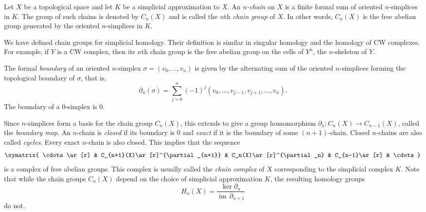 \documentclass[12pt]{article}
\newcommand{\<}{\langle}
\renewcommand{\>}{\rangle}
\DeclareMathOperator{\im}{im}
\begin{document}
Let $X$ be a topological space and let $K$ be a simplicial approximation to $X$.  An \emph{$n$-chain} on $X$ is a finite formal sum of oriented $n$-simplices in $K$.  The group of such chains is denoted by $C_n(X)$ and is called the $n$th \emph{chain group} of $X$.  In other words, $C_n(X)$ is the free abelian group generated by the oriented $n$-simplices in $K$.

We have defined chain groups for simplicial homology.  Their definition is similar in singular homology and the homology of CW complexes.  For example, if $Y$ is a CW complex, then its $n$th chain group is the free abelian group on the cells of $Y^n$, the $n$-skeleton of $Y$.

The formal \emph{boundary} of an oriented $n$-simplex $\sigma=(v_0,\dots,v_n)$ is given by the alternating sum of the oriented $n$-simplices forming the topological boundary of $\sigma$, that is,
\[
\partial_n(\sigma) = \sum_{j=0}^n (-1)^j (v_0,\dots, v_{j-1},v_{j+1},\dots, v_n).
\]
The boundary of a $0$-simplex is $0$.

Since $n$-simplices form a basis for the chain group $C_n(X)$, this extends to give a group homomorphism $\partial_n\colon C_n(X)\to C_{n-1}(X)$, called the \emph{boundary map}.  An $n$-chain is \emph{closed} if its boundary is 0 and \emph{exact} if it is the boundary of some $(n+1)$-chain.  Closed $n$-chains are also called \emph{cycles}.  Every exact $n$-chain is also closed.  This implies that the sequence
\[\xymatrix{
\cdots \ar[r] & C_{n+1}(X)\ar[r]^{\partial_{n+1}} & C_n(X)\ar[r]^{\partial_n} & C_{n-1}\ar[r] & \cdots
}\]
is a complex of free abelian groups.  This complex is usually called the \emph{chain complex} of $X$ corresponding to the simplicial complex $K$.  Note that while the chain groups $C_n(X)$ depend on the choice of simplicial approximation $K$, the resulting homology groups
\[
H_n(X) = \frac{\ker\partial_n}{\im\,\partial_{n+1}}
\]
do not.

\end{document}
